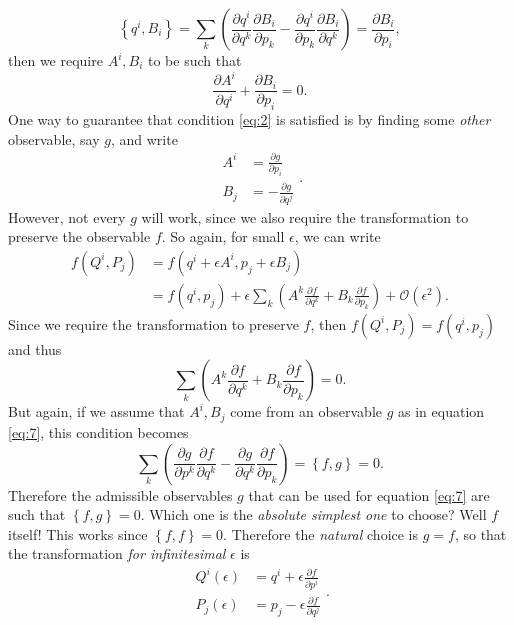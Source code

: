\documentclass[11pt,a4]{article}
\newcommand{\pdev}[2]{\frac{\partial #1}{\partial #2}}
\newcommand{\set}[1]{\left\{#1\right\}}
\begin{document}
\begin{equation}
  \set{q^i,B_i} = \sum_k\left(\pdev{q^i}{q^k}\pdev{B_i}{p_k} - \pdev{q^i}{p_k}\pdev{B_i}{q^k}\right) = \pdev{B_i}{p_i},
\end{equation}
then we require $A^i,B_i$ to be such that
\begin{equation}
  \label{eq:2}
  \pdev{A^i}{q^i} + \pdev{B_i}{p_i} = 0.
\end{equation}
One way to guarantee that condition \eqref{eq:2} is satisfied is by finding some \emph{other} observable, say $g$, and write
\begin{equation}
  \label{eq:7}
  \begin{aligned}
    A^i &= \pdev{g}{p_i}\\
    B_j &= -\pdev{g}{q^j}
  \end{aligned}.
\end{equation}
However, not every $g$ will work, since we also require the transformation to preserve the observable $f$. So again, for small
$\epsilon$, we can write
\begin{equation}
  \begin{aligned}
    f\left(Q^i,P_j \right) &= f\left(q^i+\epsilon A^i,p_j+\epsilon B_j\right)\\
    &= f\left(q^i,p_j\right) + \epsilon\sum_k\left(A^k\pdev{f}{q^k} + B_k\pdev{f}{p_k}\right) + \mathcal{O}(\epsilon^2).
\end{aligned}
\end{equation}
Since we require the transformation to preserve $f$, then $f\left(Q^i,P_j \right) = f(q^i,p_j)$ and thus
\begin{equation}
  \label{eq:6}
  \sum_k\left(A^k\pdev{f}{q^k} + B_k\pdev{f}{p_k}\right) = 0.
\end{equation}
But again, if we assume that $A^i,B_j$ come from an observable $g$ as in equation \eqref{eq:7}, this condition
becomes
\begin{equation}
  \label{eq:6}
  \sum_k\left(\pdev{g}{p^k}\pdev{f}{q^k} - \pdev{g}{q^k}\pdev{f}{p_k}\right) = \set{f,g}=0.
\end{equation}
Therefore the admissible observables $g$ that can be used for equation \eqref{eq:7} are such that $\set{f,g}=0$.
Which one is the \emph{absolute simplest one} to choose? Well $f$ itself! This works since $\set{f,f}=0$.
Therefore the \emph{natural} choice is $g=f$, so that the transformation \emph{for infinitesimal} $\epsilon$ is
\begin{equation}
  \label{eq:8}
  \begin{aligned}
    Q^i(\epsilon) &= q^i + \epsilon \pdev{f}{p^i}\\
    P_j(\epsilon) &= p_j - \epsilon \pdev{f}{q^j}
  \end{aligned}.
\end{equation}
\end{document}
